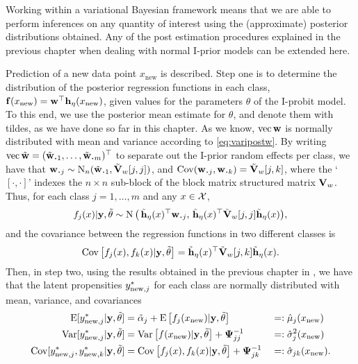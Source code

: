 Working within a variational Bayesian framework means that we are able to perform inferences on any quantity of interest using the (approximate) posterior distributions obtained.
Any of the post estimation procedures explained in the previous chapter when dealing with normal I-prior models can be extended here.

Prediction of a new data point $x_{\text{new}}$ is described.
Step one is to determine the distribution of the posterior regression functions in each class, ${\mathbf f}(x_{\text{new}}) = {\mathbf w}^\top{\mathbf h}_\eta(x_{\text{new}})$, given values for the parameters $\theta$ of the I-probit model.
To this end, we use the posterior mean estimate for $\theta$, and denote them with tildes, as we have done so far in this chapter.
As we know, $\operatorname{vec}{\mathbf w}$ is normally distributed with mean and variance according to \cref{eq:varipostw}.
By writing $\vecc \tilde\bw = (\tilde \bw_{\bigcdot 1}, \dots, \tilde \bw_{\bigcdot m})^\top$ to separate out the I-prior random effects per class, we have that $\bw_{\bigcdot j} \sim \N_n(\tilde \bw_{\bigcdot 1}, \tilde\bV_w[j,j])$, and $\Cov(\bw_{\bigcdot j},\bw_{\bigcdot k}) = \tilde\bV_w[j,k]$, where the `$[\cdot,\cdot]$' indexes the $n\times n$ sub-block of the block matrix structured matrix ${\mathbf V}_w$.
Thus, for each class $j=1,\dots,m$ and any $x \in {\mathcal X}$,
\[
  f_j(x)|\by,\tilde\theta \sim \N\big(\,
  \tilde\bh_\eta(x)^\top\bw_{\bigcdot j}, \,
  \tilde\bh_\eta(x)^\top\tilde\bV_w[j,j]\tilde\bh_\eta(x)
  \big),
\]
and the covariance between the regression functions in two different classes is
\[
  \operatorname{Cov}\big[f_j(x),f_k(x)|{\mathbf y},\tilde\theta \big] = 
  \tilde{{\mathbf h}}_\eta(x)^\top \tilde{{\mathbf V}}_w[j,k] \tilde{{\mathbf h}}_\eta(x).
\]
Then, in step two, using the results obtained in the previous chapter in , we have that the latent propensities $y_{{\text{new}},j}^*$ for each class are normally distributed with mean, variance, and covariances
\begin{alignat*}{3}
  \operatorname{E}[y_{{\text{new}},j}^*|{\mathbf y},\tilde\theta]  
  &= \tilde\alpha_j + \operatorname{E} \big[ f_j(x_{\text{new}}) |{\mathbf y},\tilde\theta \big] 
  &&=: \hat\mu_j(x_\text{new}) \\
  \operatorname{Var}[y_{{\text{new}},j}^*|{\mathbf y},\tilde\theta] 
  &= \operatorname{Var}\big[f(x_{\text{new}})|{\mathbf y},\tilde\theta \big] + {\bm\Psi}^{-1}_{jj}
  &&=: \hat\sigma_j^2(x_\text{new}) \\
  \operatorname{Cov}[y_{{\text{new}},j}^*,y_{{\text{new}},k}^*|{\mathbf y},\tilde\theta] 
  &= \operatorname{Cov}\big[f_j(x),f_k(x)|{\mathbf y},\tilde\theta \big] + {\bm\Psi}^{-1}_{jk}
  &&=: \hat\sigma_{jk}(x_\text{new}).
\end{alignat*}

